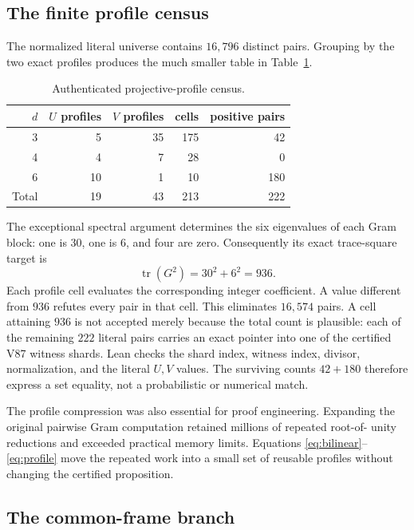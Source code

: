 \documentclass[10pt,twocolumn]{article}
\theoremstyle{definition}
\theoremstyle{remark}
\begin{document}
\subsection{The finite profile census}

The normalized literal universe contains $16{,}796$ distinct pairs.  Grouping
by the two exact profiles produces the much smaller table in
Table~\ref{tab:census}.

\begin{table}[H]
\centering
\caption{Authenticated projective-profile census.}
\label{tab:census}
\small
\begin{tabular}{@{}rrrrr@{}}
\toprule
$d$ & $U$ profiles & $V$ profiles & cells & positive pairs \\
\midrule
3 & 5 & 35 & 175 & 42 \\
4 & 4 & 7  & 28  & 0 \\
6 & 10 & 1 & 10 & 180 \\
\midrule
Total & 19 & 43 & 213 & 222 \\
\bottomrule
\end{tabular}
\end{table}

The exceptional spectral argument determines the six eigenvalues of each Gram
block: one is $30$, one is $6$, and four are zero.  Consequently its exact
trace-square target is
\[
  \operatorname{tr}(G^2)=30^2+6^2=936.
\]
Each profile cell evaluates the corresponding integer coefficient.  A value
different from $936$ refutes every pair in that cell.  This eliminates
$16{,}574$ pairs.  A cell attaining $936$ is not accepted merely because the
total count is plausible:
each of the remaining $222$ literal pairs carries an exact pointer into one of
the certified V87 witness shards.  Lean checks the shard index, witness index,
divisor, normalization, and the literal $U,V$ values.  The surviving counts
$42+180$ therefore express a set equality, not a probabilistic or numerical
match.

The profile compression was also essential for proof engineering.  Expanding
the original pairwise Gram computation retained millions of repeated root-of-
unity reductions and exceeded practical memory limits.  Equations
\eqref{eq:bilinear}--\eqref{eq:profile} move the repeated work into a small set
of reusable profiles without changing the certified proposition.

\subsection{The common-frame branch}
\end{document}
